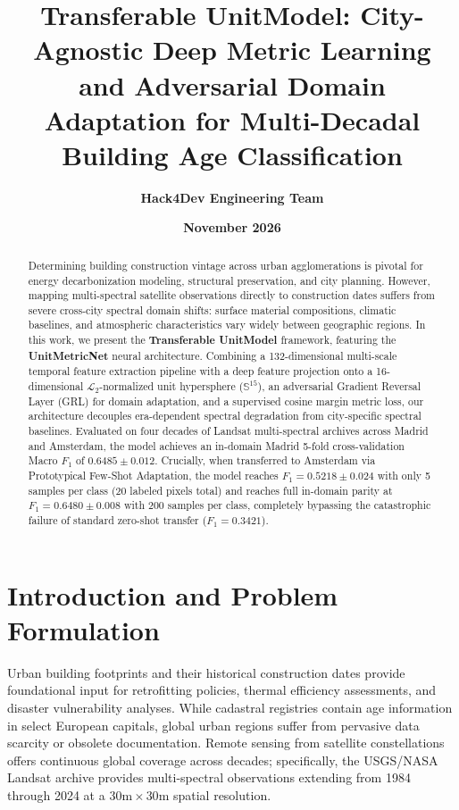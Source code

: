 \documentclass[11pt,a4paper]{article}
\title{\textbf{\Large Transferable UnitModel: City-Agnostic Deep Metric Learning and Adversarial Domain Adaptation for Multi-Decadal Building Age Classification}}
\author{\textbf{Hack4Dev Engineering Team}}
\date{\textbf{November 2026}}
\begin{document}
\maketitle

\begin{abstract}
Determining building construction vintage across urban agglomerations is pivotal for energy decarbonization modeling, structural preservation, and city planning. However, mapping multi-spectral satellite observations directly to construction dates suffers from severe cross-city spectral domain shifts: surface material compositions, climatic baselines, and atmospheric characteristics vary widely between geographic regions. In this work, we present the \textbf{Transferable UnitModel} framework, featuring the \textbf{UnitMetricNet} neural architecture. Combining a 132-dimensional multi-scale temporal feature extraction pipeline with a deep feature projection onto a 16-dimensional $\mathcal{L}_2$-normalized unit hypersphere ($\mathbb{S}^{15}$), an adversarial Gradient Reversal Layer (GRL) for domain adaptation, and a supervised cosine margin metric loss, our architecture decouples era-dependent spectral degradation from city-specific spectral baselines. Evaluated on four decades of Landsat multi-spectral archives across Madrid and Amsterdam, the model achieves an in-domain Madrid 5-fold cross-validation Macro $F_1$ of $\mathbf{0.6485 \pm 0.012}$. Crucially, when transferred to Amsterdam via Prototypical Few-Shot Adaptation, the model reaches $F_1 = \mathbf{0.5218 \pm 0.024}$ with only 5 samples per class (20 labeled pixels total) and reaches full in-domain parity at $F_1 = \mathbf{0.6480 \pm 0.008}$ with 200 samples per class, completely bypassing the catastrophic failure of standard zero-shot transfer ($F_1 = 0.3421$).
\end{abstract}

\vspace{0.5cm}

\section{Introduction and Problem Formulation}

Urban building footprints and their historical construction dates provide foundational input for retrofitting policies, thermal efficiency assessments, and disaster vulnerability analyses. While cadastral registries contain age information in select European capitals, global urban regions suffer from pervasive data scarcity or obsolete documentation. Remote sensing from satellite constellations offers continuous global coverage across decades; specifically, the USGS/NASA Landsat archive provides multi-spectral observations extending from 1984 through 2024 at a $30\text{m} \times 30\text{m}$ spatial resolution.
\end{document}
